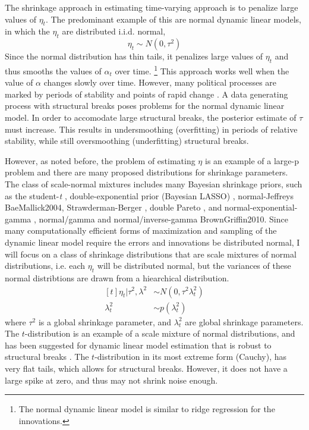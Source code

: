 \documentclass{article}
\begin{document}
The shrinkage approach in estimating time-varying approach is to penalize large values of $\eta_{t}$. 
The predominant example of this are normal dynamic linear models, in which the $\eta_{t}$ are distributed i.i.d. normal,
\begin{equation}
  \label{eq:4}
  \eta_{t} \sim N(0, \tau^{2})
\end{equation}
Since the normal distribution has thin tails, it penalizes large values of $\eta_{t}$ and thus smooths the values of $\alpha_{t}$ over time.
\footnote{The normal dynamic linear model is similar to ridge regression for the innovations.}
This approach works well when the value of $\alpha$ changes slowly over time.
However, many political processes are marked by periods of stability and points of rapid change \parencite{RatkovicEng2010}.
A data generating process with structural breaks poses problems for the normal dynamic linear model.
In order to accomodate large structural breaks, the posterior estimate of $\tau$ must increase. 
This results in undersmoothing (overfitting) in periods of relative stability, while still oversmoothing (underfitting) structural breaks.

However, as noted before, the problem of estimating $\eta$ is an example of a large-p problem and there are many proposed distributions for shrinkage parameters.
The class of scale-normal mixtures includes many Bayesian shrinkage priors, such as the student-\textit{t} \parencite{Tipping2001}, double-exponential prior (Bayesian LASSO) \parencites{LiGoel2006}{ParkCasella2008}{Hans2009}, normal-Jeffreys \parencite{FigueiredoMember2003}{BaeMallick2004}, Strawderman-Berger \parencites{Strawderman1971}{Berger1980}, double Pareto \parencite{ArmaganDunsonLee2011},  and normal-exponential-gamma \parencite{BrownGriffin2005}, normal/gamma and normal/inverse-gamma \parencite{CaronDoucet2008}{BrownGriffin2010}.
Since many computationally efficient forms of maximization and sampling of the dynamic linear model require the errors and innovations be distributed normal, I will focus on a class of shrinkage distributions that are scale mixtures of normal distributions, i.e. each $\eta_{t}$ will be distributed normal, but the variances of these normal distribtions are drawn from a hiearchical distribution.
\begin{equation}
  \label{eq:6}
  \begin{aligned}[t]
    \eta_{t} | \tau^{2}, \lambda^{2} & \sim N(0, \tau^{2} \lambda_{t}^{2}) \\
    \lambda_{t}^{2} & \sim p(\lambda^{2}_{t})
  \end{aligned}
\end{equation}
where $\tau^{2}$ is a global shrinkage parameter, and $\lambda_{t}^{2}$ are global shrinkage parameters.
The $t$-distribution is an example of a scale mixture of normal distributions, and has been suggested for dynamic linear model estimation that is robust to structural breaks \parencites{HarveyKoopman2000}{PetrisPetroneEtAl2009}.
The $t$-distribution in its most extreme form (Cauchy), has very flat tails, which allows for structural breaks.
However, it does not have a large spike at zero, and thus may not shrink noise enough.
\end{document}

